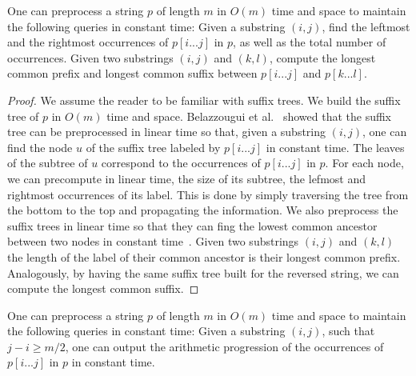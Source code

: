 \begin{proposition}
\label{prop:suffix_tree}
One can preprocess a string $p$ of length $m$ in $O(m)$ time and space to maintain the following queries in constant time: Given a substring $(i,j)$, find the leftmost and the rightmost occurrences of $p[i...j]$ in $p$, as well as the total number of occurrences. Given two substrings $(i,j)$ and $(k,l)$, compute the longest common prefix and longest common suffix between $p[i...j]$ and $p[k...l]$.
\end{proposition}
\begin{proof}
We assume the reader to be familiar with suffix trees. We build the suffix tree of $p$ in $O(m)$ time and space. Belazzougui et al.~\cite{belazzougui_et_al:LIPIcs.CPM.2021.8} showed that the suffix tree can be preprocessed in linear time so that, given a substring $(i,j)$, one can find the node $u$ of the suffix tree labeled by $p[i...j]$ in constant time. The leaves of the subtree of $u$ correspond to the occurrences of $p[i...j]$ in $p$.
For each node, we can precompute in linear time, the size of its subtree, the lefmost and rightmost occurrences of its label. This is done by simply traversing the tree from the bottom to the top and propagating the information.
We also preprocess the suffix trees in linear time so that they can fing the lowest common ancestor between two nodes in constant time~\cite{}. Given two substrings $(i,j)$ and $(k,l)$ the length of the label of their common ancestor is their longest common prefix. Analogously, by having the same suffix tree built for the reversed string, we can compute the longest common suffix.
\end{proof}

\begin{corollary}
\label{cor:imp}
One can preprocess a string $p$ of length $m$ in $O(m)$ time and space to maintain the following queries in constant time: Given a substring $(i,j)$, such that $j-i\ge m/2$, one can output the arithmetic progression of the occurrences of $p[i...j]$ in $p$ in constant time.
\end{corollary}



